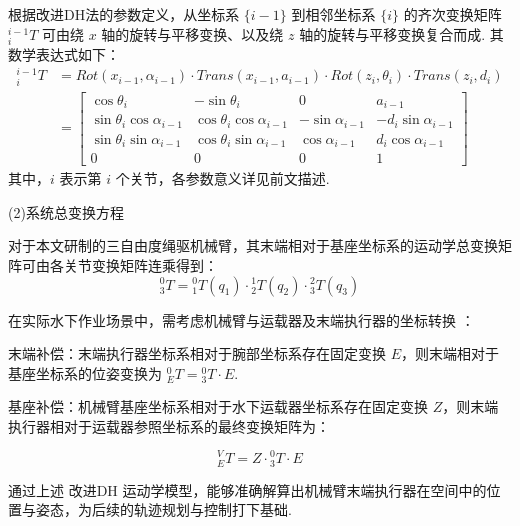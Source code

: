 根据改进DH法的参数定义，从坐标系 $\{i-1\}$ 到相邻坐标系 $\{i\}$ 的齐次变换矩阵 ${}^{i-1}_{i}T$ 可由绕 $x$ 轴的旋转与平移变换、以及绕 $z$ 轴的旋转与平移变换复合而成. 其数学表达式如下：
\begin{equation}
    \begin{aligned}
        {}^{i-1}_{i}T &= Rot(x_{i-1}, \alpha_{i-1}) \cdot Trans(x_{i-1}, a_{i-1}) \cdot Rot(z_i, \theta_i) \cdot Trans(z_i, d_i) \\
        &= \begin{bmatrix} 
        \cos\theta_i & -\sin\theta_i & 0 & a_{i-1} \\ 
        \sin\theta_i\cos\alpha_{i-1} & \cos\theta_i\cos\alpha_{i-1} & -\sin\alpha_{i-1} & -d_i\sin\alpha_{i-1} \\ 
        \sin\theta_i\sin\alpha_{i-1} & \cos\theta_i\sin\alpha_{i-1} & \cos\alpha_{i-1} & d_i\cos\alpha_{i-1} \\ 
        0 & 0 & 0 & 1 
        \end{bmatrix}
    \end{aligned}
    \label{eq:mdh_matrix}
\end{equation}
其中，$i$ 表示第 $i$ 个关节，各参数意义详见前文描述.

(2)系统总变换方程

对于本文研制的三自由度绳驱机械臂，其末端相对于基座坐标系的运动学总变换矩阵可由各关节变换矩阵连乘得到：
\begin{equation}
    {}^{0}_{3}T = {}^{0}_{1}T({q_1}) \cdot {}^{1}_{2}T({q_2}) \cdot {}^{2}_{3}T({q_3})
    \label{eq:total_t}
\end{equation}

在实际水下作业场景中，需考虑机械臂与运载器及末端执行器的坐标转换 ：

末端补偿：末端执行器坐标系相对于腕部坐标系存在固定变换 $E$，则末端相对于基座坐标系的位姿变换为 ${}^{0}_{E}T = {}^{0}_{3}T \cdot E$.

基座补偿：机械臂基座坐标系相对于水下运载器坐标系存在固定变换 $Z$，则末端执行器相对于运载器参照坐标系的最终变换矩阵为：


\begin{equation}
    {}^{V}_{E}T = Z \cdot {}^{0}_{3}T \cdot E
    \label{eq:final_t}
\end{equation}

通过上述 改进DH 运动学模型，能够准确解算出机械臂末端执行器在空间中的位置与姿态，为后续的轨迹规划与控制打下基础.

